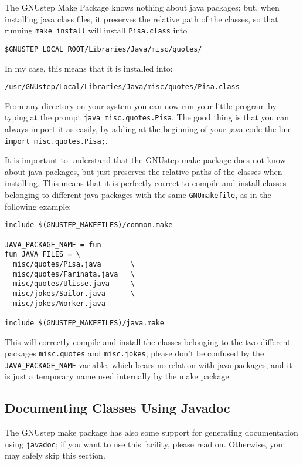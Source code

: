 The GNUstep Make Package knows nothing about java packages; but, when
installing java class files, it preserves the relative path of the
classes, so that running \texttt{make install} will install
\texttt{Pisa.class} into
\begin{verbatim}
$GNUSTEP_LOCAL_ROOT/Libraries/Java/misc/quotes/
\end{verbatim}
In my case, this means that it is installed into:
\begin{verbatim}
/usr/GNUstep/Local/Libraries/Java/misc/quotes/Pisa.class
\end{verbatim}

From any directory on your system you can now run your little program
by typing at the prompt \texttt{java misc.quotes.Pisa}.  The good
thing is that you can always import it as easily, by adding at the
beginning of your java code the line \texttt{import
misc.quotes.Pisa;}.

It is important to understand that the GNUstep make package does not
know about java packages, but just preserves the relative paths of the
classes when installing.  This means that it is perfectly correct to
compile and install classes belonging to different java packages with
the same \texttt{GNUmakefile}, as in the following example:
\begin{verbatim}
include $(GNUSTEP_MAKEFILES)/common.make

JAVA_PACKAGE_NAME = fun
fun_JAVA_FILES = \
  misc/quotes/Pisa.java       \
  misc/quotes/Farinata.java   \
  misc/quotes/Ulisse.java     \
  misc/jokes/Sailor.java      \
  misc/jokes/Worker.java

include $(GNUSTEP_MAKEFILES)/java.make
\end{verbatim}

This will correctly compile and install the classes belonging to the
two different packages \texttt{misc.quotes} and \texttt{misc.jokes};
please don't be confused by the \texttt{JAVA\_PACKAGE\_NAME} variable,
which bears no relation with java packages, and it is just a temporary
name used internally by the make package.

\subsection{Documenting Classes Using Javadoc}

The GNUstep make package has also some support for generating
documentation using \texttt{javadoc}; if you want to use this
facility, please read on.  Otherwise, you may safely skip this
section.

